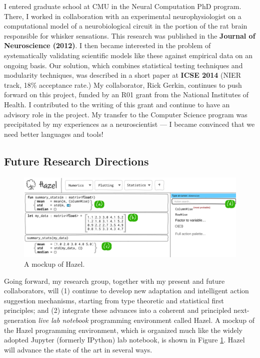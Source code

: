 \documentclass[9pt]{extarticle}
\begin{document}
I entered graduate school at CMU in the Neural Computation PhD program. There, I worked in collaboration with an experimental neurophysiologist on a computational model of a neurobiological circuit in the portion of the rat brain responsible for whisker sensations. This research was published in the \textbf{Journal of Neuroscience (2012)}. I then became interested in the problem of systematically validating scientific models like these against empirical data on an ongoing basis. Our solution, which combines statistical testing techniques and modularity techniques, was described in a short paper at \textbf{ICSE 2014} (NIER track, 18\% acceptance rate.) My collaborator, Rick Gerkin, continues to push forward on this project, funded by an R01 grant from the National Institutes of Health. I contributed to the writing of this grant and continue to have an advisory role in the project. My transfer to the Computer Science program was precipitated by my experiences as a neuroscientist --- I became convinced that we need better languages and tools!


\vspace{-8px}
\subsection*{Future Research Directions}
\vspace{-4px}

\begin{figure}
\vspace{-2ex}
\centering
\includegraphics[width=\textwidth]{mockup-1}
\vspace{-4.5ex}
\caption{A mockup of Hazel.}
\label{fig:hazel-mockup}
\vspace{-2ex}
\end{figure}

Going forward, my research group, together with my present and future collaborators, will (1) continue to develop new adaptation and intelligent action suggestion mechanisms, starting from type theoretic and statistical first principles; and (2) integrate these advances into a coherent and principled next-generation \emph{live lab notebook} programming environment called Hazel. A mockup of the Hazel programming environment, which is organized much like the widely adopted Jupyter (formerly IPython) lab notebook, is shown in Figure \ref{fig:hazel-mockup}. Hazel will advance the state of the art in several ways. 
\end{document}
